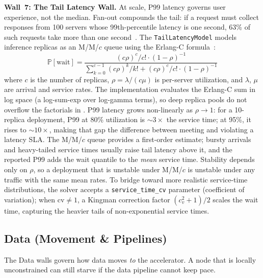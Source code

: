 \documentclass[10pt,twocolumn]{article}
\begin{document}
\textbf{Wall~7: The Tail Latency Wall.} At scale, P99 latency governs user experience, not the median. Fan-out compounds the tail: if a request must collect responses from 100 servers whose 99th-percentile latency is one second, 63\% of such requests take more than one second~\citep{dean2013}. The \texttt{TailLatencyModel} models inference replicas as an M/M/$c$ queue using the Erlang-C formula~\citep{harcholbalter2013}:
\begin{equation}
\label{eq:erlangc}
\mathbb{P}[\text{wait}] = \frac{(c\rho)^c / c! \cdot (1-\rho)^{-1}}{\sum_{k=0}^{c-1}(c\rho)^k/k! + (c\rho)^c/c! \cdot (1-\rho)^{-1}}
\end{equation}
where $c$ is the number of replicas, $\rho = \lambda / (c\mu)$ is per-server utilization, and $\lambda$, $\mu$ are arrival and service rates. The implementation evaluates the Erlang-C sum in log space (a log-sum-exp over log-gamma terms), so deep replica pools do not overflow the factorials in . P99 latency grows non-linearly as $\rho \to 1$: for a 10-replica deployment, P99 at 80\% utilization is ${\sim}3{\times}$ the service time; at 95\%, it rises to ${\sim}10{\times}$, making that gap the difference between meeting and violating a latency SLA. The M/M/$c$ queue provides a first-order estimate; bursty arrivals and heavy-tailed service times usually raise tail latency above it, and the reported P99 adds the wait quantile to the \emph{mean} service time. Stability depends only on $\rho$, so a deployment that is unstable under M/M/$c$ is unstable under any traffic with the same mean rates. To bridge toward more realistic service-time distributions, the solver accepts a \texttt{service\_time\_cv} parameter (coefficient of variation); when $\text{cv} \neq 1$, a Kingman correction factor $(c_v^2 + 1)/2$ scales the wait time, capturing the heavier tails of non-exponential service times.

\subsection{Data (Movement \& Pipelines)}
\label{sec:walls-data}

The Data walls govern how data moves \emph{to} the accelerator. A node that is locally unconstrained can still starve if the data pipeline cannot keep pace.
\end{document}
